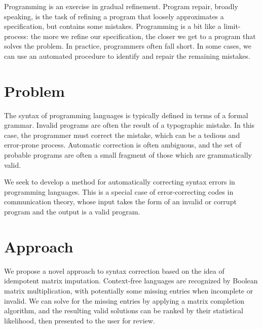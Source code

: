 \documentclass[sigplan,screen]{acmart}
\begin{document}
Programming is an exercise in gradual refinement. Program repair, broadly speaking, is the task of refining a program that loosely approximates a specification, but contains some mistakes. Programming is a bit like a limit-process: the more we refine our specification, the closer we get to a program that solves the problem. In practice, programmers often fall short. In some cases, we can use an automated procedure to identify and repair the remaining mistakes.

\section{Problem}


The syntax of programming languages is typically defined in terms of a formal grammar. Invalid programs are often the result of a typographic mistake. In this case, the programmer must correct the mistake, which can be a tedious and error-prone process. Automatic correction is often ambiguous, and the set of probable programs are often a small fragment of those which are grammatically valid.

We seek to develop a method for automatically correcting syntax errors in programming languages. This is a special case of error-correcting codes in communication theory, whose input takes the form of an invalid or corrupt program and the output is a valid program.

\section{Approach}


We propose a novel approach to syntax correction based on the idea of idempotent matrix imputation. Context-free languages are recognized by Boolean matrix multiplication, with potentially some missing entries when incomplete or invalid. We can solve for the missing entries by applying a matrix completion algorithm, and the resulting valid solutions can be ranked by their statistical likelihood, then presented to the user for review.
\end{document}

